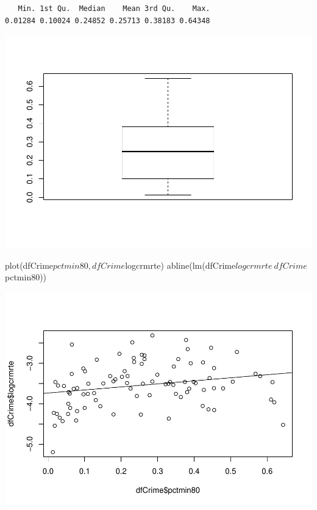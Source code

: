\documentclass[]{article}
\newenvironment{Shaded}{}{}
\newcommand{\KeywordTok}[1]{\textcolor[rgb]{0.00,0.00,1.00}{#1}}
\newcommand{\NormalTok}[1]{#1}
\newcommand{\OperatorTok}[1]{#1}
\begin{document}
\begin{verbatim}
   Min. 1st Qu.  Median    Mean 3rd Qu.    Max. 
0.01284 0.10024 0.24852 0.25713 0.38183 0.64348 
\end{verbatim}

\begin{Shaded}
\end{Shaded}

\includegraphics{Bagnard_Gaustad_Hartman_Leung_Lab_3_files/figure-latex/unnamed-chunk-97-1.pdf}

\begin{Shaded}
\begin{Highlighting}[]
\KeywordTok{plot}\NormalTok{(dfCrime}\OperatorTok{$}\NormalTok{pctmin80, dfCrime}\OperatorTok{$}\NormalTok{logcrmrte)}
\KeywordTok{abline}\NormalTok{(}\KeywordTok{lm}\NormalTok{(dfCrime}\OperatorTok{$}\NormalTok{logcrmrte}\OperatorTok{~}\NormalTok{dfCrime}\OperatorTok{$}\NormalTok{pctmin80))}
\end{Highlighting}
\end{Shaded}

\includegraphics{Bagnard_Gaustad_Hartman_Leung_Lab_3_files/figure-latex/unnamed-chunk-98-1.pdf}
\end{document}
